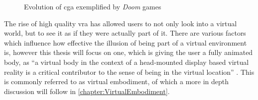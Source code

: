\begin{figure}[h]%
  \centering
  \hfill
  \caption{Evolution of \gls{cga} exemplified by \textit{Doom} games}
  \label{fig:doom1993vs2016}
\end{figure}

The rise of high quality \gls{vra} has allowed users to not only look into a virtual world, but to see it as if they were actually part of it. There are various factors which influence how effective the illusion of being part of a virtual environment is, however this thesis will focus on one, which is giving the user a fully animated body, as \enquote{a virtual body in the context of a head-mounted display based virtual reality is a critical contributor to the sense of being in the virtual location} \autocite[p.~374]{senseEmbodimentVR}. This is commonly referred to as virtual embodiment, of which a more in depth discussion will follow in \autoref{chapter:VirtualEmbodiment}.
\newline

